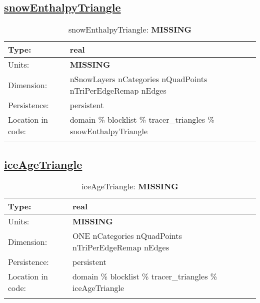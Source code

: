 \subsection[snowEnthalpyTriangle]{\hyperref[sec:var_tab_tracer_triangles]{snowEnthalpyTriangle}}
\label{subsec:var_sec_tracer_triangles_snowEnthalpyTriangle}
\begin{center}
\begin{longtable}{| p{2.0in} | p{4.0in} |}
        \hline 
        Type: & real \\
        \hline 
        Units: & {\bf \color{red} MISSING} \\
        \hline 
        Dimension: & nSnowLayers nCategories nQuadPoints nTriPerEdgeRemap nEdges \\
        \hline 
        Persistence: & persistent \\
        \hline 
         Location in code: & domain \% blocklist \% tracer\_triangles \% snowEnthalpyTriangle \\
         \hline 
    \caption{snowEnthalpyTriangle: {\bf \color{red} MISSING}}
\end{longtable}
\end{center}
\subsection[iceAgeTriangle]{\hyperref[sec:var_tab_tracer_triangles]{iceAgeTriangle}}
\label{subsec:var_sec_tracer_triangles_iceAgeTriangle}
\begin{center}
\begin{longtable}{| p{2.0in} | p{4.0in} |}
        \hline 
        Type: & real \\
        \hline 
        Units: & {\bf \color{red} MISSING} \\
        \hline 
        Dimension: & ONE nCategories nQuadPoints nTriPerEdgeRemap nEdges \\
        \hline 
        Persistence: & persistent \\
        \hline 
         Location in code: & domain \% blocklist \% tracer\_triangles \% iceAgeTriangle \\
         \hline 
    \caption{iceAgeTriangle: {\bf \color{red} MISSING}}
\end{longtable}
\end{center}
